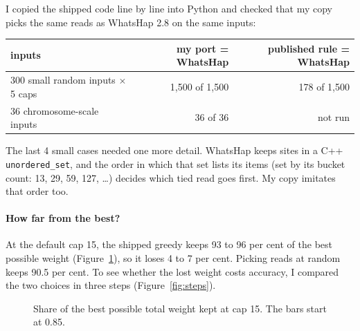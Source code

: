 \documentclass[11pt]{article}
\newcommand{\code}[1]{\texttt{#1}}
\newcommand{\failbar}[5]{%
  \node[anchor=east,font=\scriptsize,align=right] at (-0.03,#1) {#2};
  \fill[gray!20] (0,#1-0.13) rectangle (1,#1+0.13);
  \fill[#5] (0,#1-0.13) rectangle ({max(#3,0.008)},#1+0.13);
  \node[anchor=west,font=\scriptsize\bfseries,text=#5] at (1.03,#1) {#4};}
\begin{document}
I copied the shipped code line by line into Python and checked that my
copy picks the same reads as WhatsHap 2.8 on the same inputs:

\begin{center}
\small
\begin{tabular}{@{}lrr@{}}
\toprule
inputs & my port = WhatsHap & published rule = WhatsHap\\
\midrule
300 small random inputs $\times$ 5 caps & 1{,}500 of 1{,}500 & 178 of 1{,}500\\
36 chromosome-scale inputs & 36 of 36 & not run\\
\bottomrule
\end{tabular}
\end{center}

The last 4 small cases needed one more detail. WhatsHap keeps sites in a
C++ \code{unordered\_set}, and the order in which that set lists its items
(set by its bucket count: 13, 29, 59, 127, \dots) decides which tied read
goes first. My copy imitates that order too.

\paragraph{How far from the best?} At the default cap 15, the shipped greedy
keeps 93 to 96 per cent of the best possible weight (Figure~\ref{fig:gap}),
so it loses 4 to 7 per cent. Picking reads at random keeps 90.5 per cent. To
see whether the lost weight costs accuracy, I compared the two choices in
three steps (Figure~\ref{fig:steps}).

\begin{figure}[h]
\centering
{}
\caption{Share of the best possible total weight kept at cap 15. The bars
start at 0.85.}
\label{fig:gap}
\end{figure}
\end{document}
